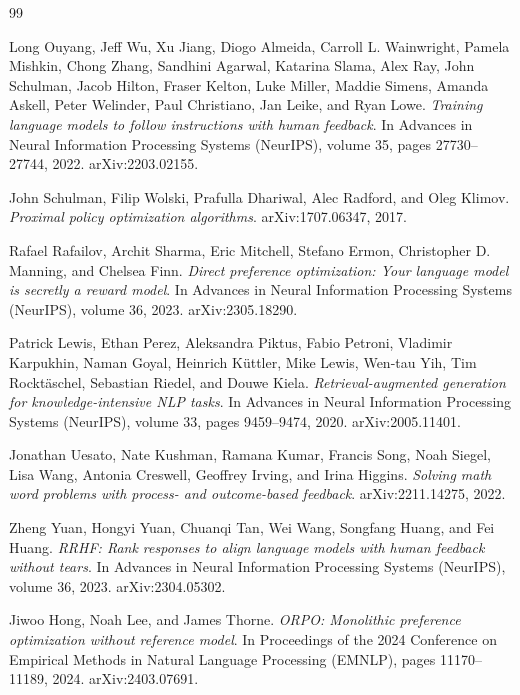 \begin{thebibliography}{99}

Long Ouyang, Jeff Wu, Xu Jiang, Diogo Almeida, Carroll L. Wainwright, Pamela Mishkin, Chong Zhang, Sandhini Agarwal, Katarina Slama, Alex Ray, John Schulman, Jacob Hilton, Fraser Kelton, Luke Miller, Maddie Simens, Amanda Askell, Peter Welinder, Paul Christiano, Jan Leike, and Ryan Lowe.
\textit{Training language models to follow instructions with human feedback}.
In Advances in Neural Information Processing Systems (NeurIPS), volume 35, pages 27730--27744, 2022.
arXiv:2203.02155.

John Schulman, Filip Wolski, Prafulla Dhariwal, Alec Radford, and Oleg Klimov.
\textit{Proximal policy optimization algorithms}.
arXiv:1707.06347, 2017.

Rafael Rafailov, Archit Sharma, Eric Mitchell, Stefano Ermon, Christopher D. Manning, and Chelsea Finn.
\textit{Direct preference optimization: Your language model is secretly a reward model}.
In Advances in Neural Information Processing Systems (NeurIPS), volume 36, 2023.
arXiv:2305.18290.

Patrick Lewis, Ethan Perez, Aleksandra Piktus, Fabio Petroni, Vladimir Karpukhin, Naman Goyal, Heinrich K\"uttler, Mike Lewis, Wen-tau Yih, Tim Rockt\"aschel, Sebastian Riedel, and Douwe Kiela.
\textit{Retrieval-augmented generation for knowledge-intensive NLP tasks}.
In Advances in Neural Information Processing Systems (NeurIPS), volume 33, pages 9459--9474, 2020.
arXiv:2005.11401.

Jonathan Uesato, Nate Kushman, Ramana Kumar, Francis Song, Noah Siegel, Lisa Wang, Antonia Creswell, Geoffrey Irving, and Irina Higgins.
\textit{Solving math word problems with process- and outcome-based feedback}.
arXiv:2211.14275, 2022.

Zheng Yuan, Hongyi Yuan, Chuanqi Tan, Wei Wang, Songfang Huang, and Fei Huang.
\textit{RRHF: Rank responses to align language models with human feedback without tears}.
In Advances in Neural Information Processing Systems (NeurIPS), volume 36, 2023.
arXiv:2304.05302.

Jiwoo Hong, Noah Lee, and James Thorne.
\textit{ORPO: Monolithic preference optimization without reference model}.
In Proceedings of the 2024 Conference on Empirical Methods in Natural Language Processing (EMNLP), pages 11170--11189, 2024.
arXiv:2403.07691.


\end{thebibliography}
